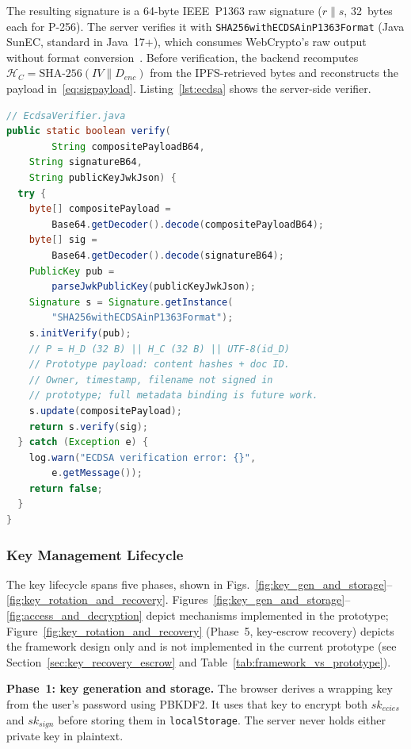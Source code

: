 \documentclass{ieeeaccess}
\begin{document}
The resulting signature is a 64-byte IEEE~P1363 raw signature ($r \| s$,
32~bytes each for P-256). The server verifies it with
\texttt{SHA256with}\allowbreak\texttt{ECDSAin}\allowbreak\texttt{P1363Format}
(Java SunEC, standard in Java~17+), which consumes WebCrypto's raw output
without format conversion~\cite{fips1865}. Before verification, the
backend recomputes $\mathcal{H}_C = \text{SHA-256}(IV \| D_{enc})$ from
the IPFS-retrieved bytes and reconstructs the payload in~\eqref{eq:sigpayload}.
Listing~\ref{lst:ecdsa} shows the server-side verifier.

\begin{lstlisting}[language=Java,
    float=!t,
    caption={Server-side ECDSA P-256 verification.
    \texttt{SHA256withECDSAinP1363Format} natively consumes
    WebCrypto's raw $r \| s$ output without format conversion.},
    label=lst:ecdsa]
// EcdsaVerifier.java
public static boolean verify(
        String compositePayloadB64,
    String signatureB64,
    String publicKeyJwkJson) {
  try {
    byte[] compositePayload =
        Base64.getDecoder().decode(compositePayloadB64); 
    byte[] sig =
        Base64.getDecoder().decode(signatureB64);
    PublicKey pub =
        parseJwkPublicKey(publicKeyJwkJson);
    Signature s = Signature.getInstance(
        "SHA256withECDSAinP1363Format");
    s.initVerify(pub);
    // P = H_D (32 B) || H_C (32 B) || UTF-8(id_D)
    // Prototype payload: content hashes + doc ID.
    // Owner, timestamp, filename not signed in
    // prototype; full metadata binding is future work.
    s.update(compositePayload);
    return s.verify(sig);
  } catch (Exception e) {
    log.warn("ECDSA verification error: {}",
        e.getMessage());
    return false;
  }
}
\end{lstlisting}

\subsubsection{Key Management Lifecycle}
\label{sec:keymgmt}
The key lifecycle spans five phases, shown in
Figs.~\ref{fig:key_gen_and_storage}--\ref{fig:key_rotation_and_recovery}.
Figures~\ref{fig:key_gen_and_storage}--\ref{fig:access_and_decryption}
depict mechanisms implemented in the prototype; Figure~\ref{fig:key_rotation_and_recovery}
(Phase~5, key-escrow recovery) depicts the framework design only and is not
implemented in the current prototype (see Section~\ref{sec:key_recovery_escrow}
and Table~\ref{tab:framework_vs_prototype}).

\textbf{Phase~1: key generation and storage.} The browser derives a
wrapping key from the user's password using PBKDF2. It uses that key to
encrypt both $sk_{ecies}$ and $sk_{sign}$ before storing them in
\texttt{localStorage}. The server never holds either private key in
plaintext.
\end{document}
